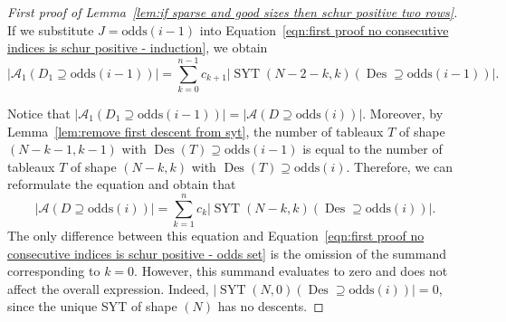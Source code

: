 \documentclass[11pt]{article}
\theoremstyle{definition}
\numberwithin{equation}{section}
\newcommand{\Des}{\operatorname{Des}}
\newcommand{\Syt}{\operatorname{SYT}}
\newcommand{\A}{\mathcal{A}}
\newcommand{\odds}{\mathrm{odds}}
\begin{document}
\begin{proof}[First proof of Lemma~\ref{lem:if sparse and good sizes then schur positive two rows}]
    If we substitute $J = \odds(i-1)$ into Equation~\ref{eqn:first proof no consecutive indices is schur positive - induction}, we obtain
    \[
        \left|\A_1(D_1 \supseteq \odds(i-1))\right| = 
         \sum_{k=0}^{n-1} c_{k+1} \left|\Syt(N-2-k,k)(\Des \supseteq \odds(i-1))\right|.
    \]

    Notice that $\left|\A_1(D_1 \supseteq \odds(i-1))\right| = \left|\A(D \supseteq \odds(i))\right|$. Moreover, by Lemma~\ref{lem:remove first descent from syt}, the number of tableaux $T$ of shape $(N-k-1,k-1)$ with $\Des(T) \supseteq \odds(i-1)$ is equal to the number of tableaux $T$ of shape $(N-k,k)$ with $\Des(T) \supseteq \odds(i)$. Therefore, we can reformulate the equation and obtain that
    \[
        \left|\A(D \supseteq \odds(i))\right| = 
         \sum_{k=1}^{n} c_k \left|\Syt(N-k,k)(\Des \supseteq \odds(i))\right|.
    \]
    The only difference between this equation and Equation~\eqref{eqn:first proof no consecutive indices is schur positive - odds set} is the omission of the summand corresponding to $k=0$. However, this summand evaluates to zero and does not affect the overall expression. Indeed, $\left|\Syt(N,0)(\Des \supseteq \odds(i))\right| = 0$, since the unique SYT of shape $(N)$ has no descents.
\end{proof}
\end{document}
